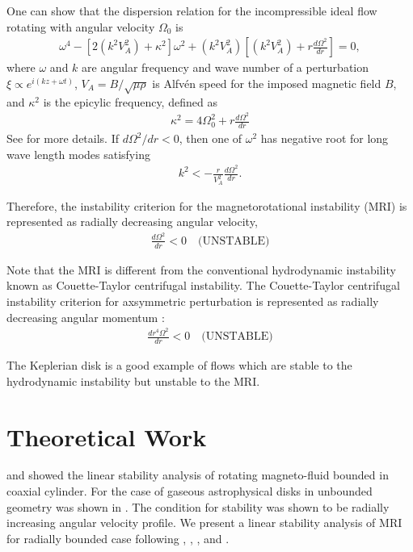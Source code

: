 \documentclass{jfm}
\begin{document}
One can show that the dispersion relation for the incompressible ideal flow 
rotating with angular velocity $\Omega_0$ is
\begin{align}
    \omega^4-\left[2\left(k^2 V_A^2\right) +\kappa^2\right]\omega^2 +\left(k^2 V_A^2\right)\left[\left(k^2 V_A^2\right)+r\frac{d \Omega^2}{dr}\right]=0,
\end{align}
where $\omega$ and $k$ are angular frequency and wave number of a perturbation
$\xi \propto e^{i(k z+\omega t)}$, $V_A = B / \sqrt{\mu \rho}$ is Alfv\'en speed
for the imposed magnetic field $B$, and $\kappa^2$ is the epicylic frequency, 
defined as
\begin{align}
    \kappa^2=4\Omega_0^2 + r \frac{d \Omega^2}{dr}
\end{align}
See \cite{Balbus1991, Balbus1998, Balbus2003} for more details. If 
$d \Omega^2 / dr < 0$, then one of $\omega^2$ has negative root for long wave 
length modes satisfying
\begin{align}
    k^2 < -\frac{r}{V_A^2}\frac{d\Omega^2}{dr}.
\end{align}

Therefore, the instability criterion for the magnetorotational instability (MRI)
is represented as radially decreasing angular velocity,
\begin{align}
    \frac{d \Omega^2}{dr}<0 \quad \text{(UNSTABLE)}
\end{align} 

Note that the MRI is different from the conventional hydrodynamic instability 
known as Couette-Taylor centrifugal instability. The Couette-Taylor centrifugal
instability criterion for axsymmetric perturbation is represented as radially 
decreasing angular momentum \citep{Charru2011}:
\begin{align}
    \frac{d r^4 \Omega^2}{dr} <0 \quad \text{(UNSTABLE)}
\end{align}

The Keplerian disk is a good example of flows which are stable to the 
hydrodynamic instability but unstable to the MRI.



\section{Theoretical Work}
\label{sec:theory}

\cite{Acheson1973} and \cite{Knobloch1992} showed the linear stability analysis
of rotating magneto-fluid bounded in coaxial cylinder. For the case of gaseous 
astrophysical disks in unbounded geometry was shown in \cite{Balbus1991}. The 
condition for stability was shown to be radially increasing angular velocity 
profile. We present a linear stability analysis of MRI for radially bounded case 
following \cite{Acheson1972}, \cite{Acheson1973a}, \cite{Knobloch1992}, and 
\cite{Julien2010}.
\end{document}
